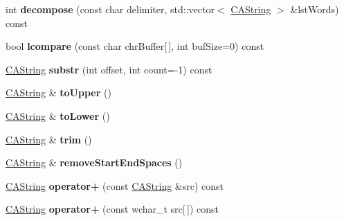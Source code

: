 \begin{DoxyCompactItemize}
\item 
\hypertarget{classps_1_1CAString_a7339075a2505f549ba01eca7718ea6db}{}int {\bfseries decompose} (const char delimiter, std\+::vector$<$ \hyperlink{classps_1_1CAString}{C\+A\+String} $>$ \&lst\+Words) const \label{classps_1_1CAString_a7339075a2505f549ba01eca7718ea6db}

\item 
\hypertarget{classps_1_1CAString_ae75f719e7ede68c1c4648774e4783711}{}bool {\bfseries lcompare} (const char chr\+Buffer\mbox{[}$\,$\mbox{]}, int buf\+Size=0) const \label{classps_1_1CAString_ae75f719e7ede68c1c4648774e4783711}

\item 
\hypertarget{classps_1_1CAString_a5c1f5a59fba5cb27d9e58c1ab43278e5}{}\hyperlink{classps_1_1CAString}{C\+A\+String} {\bfseries substr} (int offset, int count=-\/1) const \label{classps_1_1CAString_a5c1f5a59fba5cb27d9e58c1ab43278e5}

\item 
\hypertarget{classps_1_1CAString_a863f320cc91ba125b6b29417900363c0}{}\hyperlink{classps_1_1CAString}{C\+A\+String} \& {\bfseries to\+Upper} ()\label{classps_1_1CAString_a863f320cc91ba125b6b29417900363c0}

\item 
\hypertarget{classps_1_1CAString_a5123aff60bc7633b18b4209908489c13}{}\hyperlink{classps_1_1CAString}{C\+A\+String} \& {\bfseries to\+Lower} ()\label{classps_1_1CAString_a5123aff60bc7633b18b4209908489c13}

\item 
\hypertarget{classps_1_1CAString_a201d0ae9c52d9fe90a10583760d33318}{}\hyperlink{classps_1_1CAString}{C\+A\+String} \& {\bfseries trim} ()\label{classps_1_1CAString_a201d0ae9c52d9fe90a10583760d33318}

\item 
\hypertarget{classps_1_1CAString_a9f08e764d29adab7b454984e165032f5}{}\hyperlink{classps_1_1CAString}{C\+A\+String} \& {\bfseries remove\+Start\+End\+Spaces} ()\label{classps_1_1CAString_a9f08e764d29adab7b454984e165032f5}

\item 
\hypertarget{classps_1_1CAString_a4511309ba8e89ab75b8d08e32cadd54f}{}\hyperlink{classps_1_1CAString}{C\+A\+String} {\bfseries operator+} (const \hyperlink{classps_1_1CAString}{C\+A\+String} \&src) const \label{classps_1_1CAString_a4511309ba8e89ab75b8d08e32cadd54f}

\item 
\hypertarget{classps_1_1CAString_a88c6430834b9cc4e5dea0dde0b2664f8}{}\hyperlink{classps_1_1CAString}{C\+A\+String} {\bfseries operator+} (const wchar\+\_\+t src\mbox{[}$\,$\mbox{]}) const \label{classps_1_1CAString_a88c6430834b9cc4e5dea0dde0b2664f8}


\end{DoxyCompactItemize}
